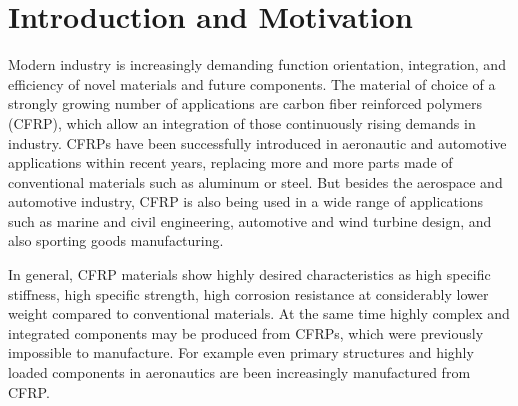 


\section{Introduction and Motivation}
\label{sec:intro}

Modern industry is increasingly demanding function orientation, integration, and efficiency of novel materials and future components. The material of choice of a strongly growing number of applications are carbon fiber reinforced polymers (CFRP), which allow an integration of those continuously rising demands in industry. CFRPs have been successfully introduced in aeronautic and automotive applications within recent years, replacing more and more parts made of conventional materials such as aluminum or steel. But besides the aerospace and automotive industry, CFRP is also being used in a wide range of applications such as marine and civil engineering, automotive and wind turbine design, and also sporting goods manufacturing. 

In general, CFRP materials show highly desired characteristics as high specific stiffness, high specific strength, high corrosion resistance at considerably lower weight compared to conventional materials. At the same time highly complex and integrated components may be produced from CFRPs, which were previously impossible to manufacture. For example even primary structures and highly loaded components in aeronautics are been increasingly manufactured from CFRP.


